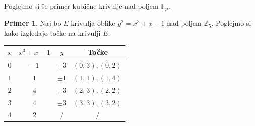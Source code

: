 \documentclass[12pt,a4paper,twoside]{article}
\theoremstyle{definition} %
\newtheorem{primer}[definicija]{Primer}
\theoremstyle{plain} %
\numberwithin{equation}{section}  %
\newcommand{\Z}{\mathbb Z}
\newcommand{\F}{\mathbb F}
\begin{document}
Poglejmo si še primer kubične krivulje nad poljem $\F_p$.

\begin{primer}
Naj bo $E$ krivulja oblike $y^2 = x^3+x-1$ nad poljem $\Z_5$. Poglejmo si kako izgledajo točke na krivulji $E$.

\begin{table}[H]
\centering
\begin{tabular}{c|c|c|c}
$x$      & $x^3+x-1$ & $y$      & Točke         \\ \hline
$0$      & $-1$      & $\pm 3$  & $(0,3),(0,2)$ \\
$1$      & $1$       & $\pm 1$  & $(1,1),(1,4)$ \\
$2$      & $4$       & $\pm 3$  & $(2,3),(2,2)$ \\
$3$      & $4$       & $\pm 3$  & $(3,3),(3,2)$ \\
$4$      & $2$       & /        & /            
\end{tabular}
\end{table}


\end{primer}
\end{document}

